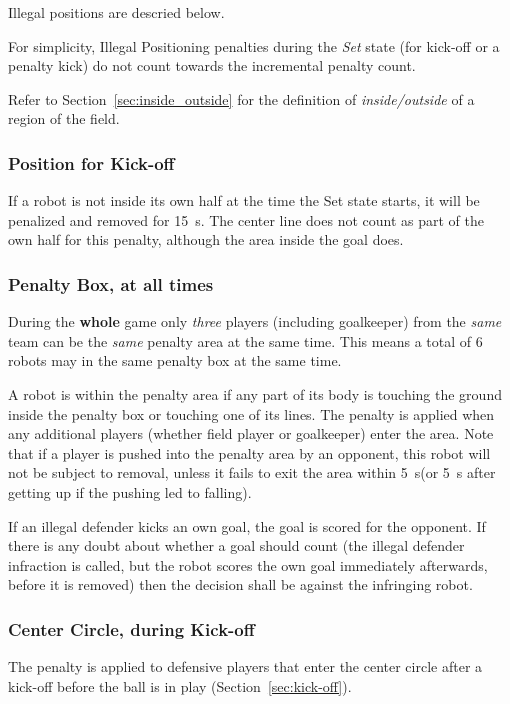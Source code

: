 Illegal positions are descried below.

For simplicity, Illegal Positioning penalties during the \textit{Set} state (for kick-off or a penalty kick) do not count towards the incremental penalty count.

Refer to Section~\ref{sec:inside_outside} for the definition of \textit{inside/outside} of a region of the field.

\subsubsection{Position for Kick-off}
If a robot is not inside its own half at the time the Set state starts, it will be penalized and removed for \qty{15}{\second}. The center line does not count as part of the own half for this penalty, although the area inside the goal does.

\subsubsection{Penalty Box, at all times}

During the \textbf{whole} game only \textit{three} players (including goalkeeper) from the \textit{same} team can be the \textit{same} penalty area at the same time. This means a total of 6 robots may in the same penalty box at the same time.

A robot is within the penalty area if any part of its body is touching the ground inside the penalty box or touching one of its lines. The penalty is applied when any additional players (whether field player or goalkeeper) enter the area. Note that if a player is pushed into the penalty area by an opponent, this robot will not be subject to removal, unless it fails to exit the area within \qty{5}{\second}(or \qty{5}{\second} after getting up if the pushing led to falling).

If an illegal defender kicks an own goal, the goal is scored for the opponent. If there is any doubt about whether a goal should count (\eg the illegal defender infraction is called, but the robot scores the own goal immediately afterwards, before it is removed) then the decision shall be against the infringing robot.

\subsubsection{Center Circle, during Kick-off}

The penalty is applied to defensive players that enter the center circle after a kick-off before the ball is in play (\cf Section~\ref{sec:kick-off}).

